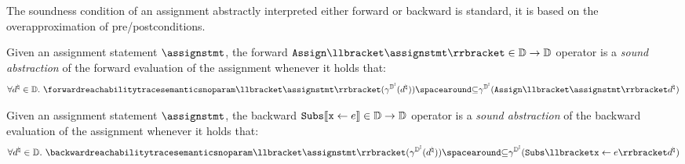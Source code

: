 \begin{description}
  The soundness condition of an assignment abstractly interpreted either forward or backward is standard, it is based on the overapproximation of pre/postconditions.
  \begin{definition}
    Given an assignment statement $\assignstmt$, the forward $\abstractdomainassign \semanticsof{\assignstmt}\in \abstractdomain \to \abstractdomain$ operator is a \emph{sound abstraction} of the forward evaluation of the assignment whenever it holds that:
  \begin{align*}
    \forall \defabstractvalue\in\abstractdomain.\spacer \forwardreachabilitytracesemanticsnoparam\semanticsof{\assignstmt}( \intervalabstractdomainconcretization(\defabstractvalue)) \SubseteQ \intervalabstractdomainconcretization(\abstractdomainassign \semanticsof{\assignstmt}\defabstractvalue)
  \end{align*}
\end{definition}
\begin{definition}
  Given an assignment statement $\assignstmt$, the backward $\textup{\texttt{Subs}}\llbracket \textup{\texttt{x}}\leftarrow e \rrbracket \in \mathbb{D} \to \mathbb{D}$ operator is a \emph{sound abstraction} of the backward evaluation of the assignment whenever it holds that:
\begin{align*}
  \forall \defabstractvalue\in\abstractdomain.\spacer \backwardreachabilitytracesemanticsnoparam\semanticsof{\assignstmt}( \intervalabstractdomainconcretization(\defabstractvalue)) \SubseteQ \intervalabstractdomainconcretization(\abstractdomainsubstitute{\defvariable}{\defaexp} \defabstractvalue)
\end{align*}
\end{definition}


\end{description}
